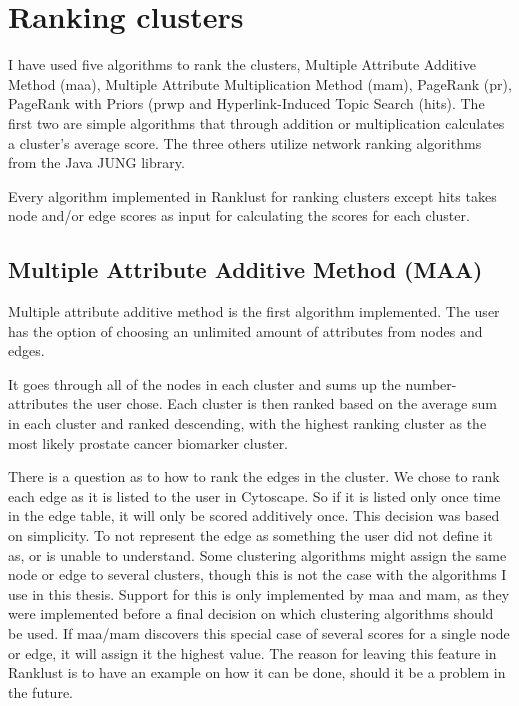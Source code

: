\section{Ranking clusters}
I have used five algorithms to rank the clusters, Multiple Attribute Additive
Method (\gls{maa}), Multiple Attribute Multiplication Method (\gls{mam}),
PageRank (\gls{pr}), PageRank with Priors (\gls{prwp} and Hyperlink-Induced
Topic Search (\gls{hits}). The first two are simple algorithms that through
addition or multiplication calculates a cluster's average score. The three
others utilize network ranking algorithms from the Java JUNG\cite{jung} library.

Every algorithm implemented in Ranklust for ranking clusters except \gls{hits}
takes node and/or edge scores as input for calculating the scores for each
cluster.

\subsection{Multiple Attribute Additive Method (MAA)}
Multiple attribute additive method is the first algorithm implemented.  The user
has the option of choosing an unlimited amount of attributes from nodes and
edges.

It goes through all of the nodes in each cluster and sums up the number-
attributes the user chose. Each cluster is then ranked based on the average sum
in each cluster and ranked descending, with the highest ranking cluster as the
most likely prostate cancer biomarker cluster.

There is a question as to how to rank the edges in the cluster. We chose to rank
each edge as it is listed to the user in Cytoscape. So if it is listed only once
time in the edge table, it will only be scored additively once. This decision
was based on simplicity. To not represent the edge as something the user did not
define it as, or is unable to understand. Some clustering algorithms might
assign the same node or edge to several clusters, though this is not the case
with the algorithms I use in this thesis. Support for this is only implemented
by \gls{maa} and \gls{mam}, as they were implemented before a final decision on
which clustering algorithms should be used. If \gls{maa}/\gls{mam} discovers
this special case of several scores for a single node or edge, it will assign it
the highest value.  The reason for leaving this feature in Ranklust is to have
an example on how it can be done, should it be a problem in the future.

